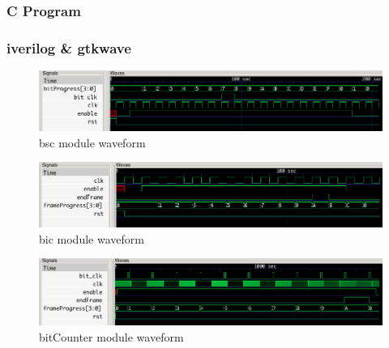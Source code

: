 \documentclass{article}
\begin{document}
      
      

      
      

      

      
      

    \subsubsection{C Program}
      

      

    \subsubsection{iverilog \& gtkwave}
      \begin{figure}[H]
        \centering
        \includegraphics[width=0.75\linewidth]{figures/gtkwave/bsc_gtkwave.png}
        \caption{bsc module waveform}
        \label{fig:bsc_gtkwave}
      \end{figure}

      \begin{figure}[H]
        \centering
        \includegraphics[width=0.75\linewidth]{figures/gtkwave/bic_gtkwave.png}
        \caption{bic module waveform}
        \label{fig:bic_gtkwave}
      \end{figure}

      \begin{figure}[H]
        \centering
        \includegraphics[width=0.75\linewidth]{figures/gtkwave/bitCounter_gtkwave.png}
        \caption{bitCounter module waveform}
        \label{fig:bitCounter_gtkwave}
      \end{figure}
\end{document}
